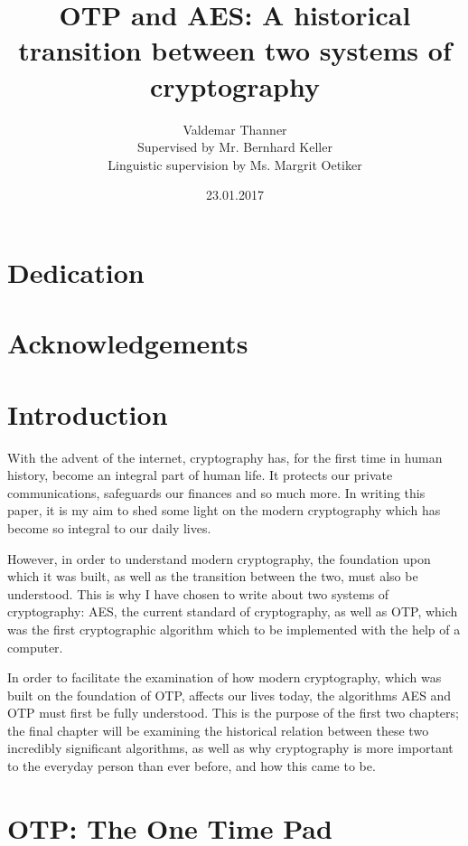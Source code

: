 \documentclass[12pt]{report}
\theoremstyle{definition}
\theoremstyle{remark}
\begin{document}
\title{OTP and AES: A historical transition between two systems of cryptography}
\author{Valdemar Thanner\\Supervised by Mr. Bernhard Keller\\Linguistic supervision by Ms. Margrit Oetiker}
\date{23.01.2017}
\maketitle

\chapter*{Dedication}

\chapter*{Acknowledgements}

\chapter*{Introduction}
With the advent of the internet, cryptography has, for the first time in human history, become an integral part of human life. It protects our private communications, safeguards our finances and so much more. In writing this paper, it is my aim to shed some light on the modern cryptography which has become so integral to our daily lives.

However, in order to understand modern cryptography, the foundation upon which it was built, as well as the transition between the two, must also be understood. This is why I have chosen to write about two systems of cryptography: AES, the current standard of cryptography, as well as OTP, which was the first cryptographic algorithm which to be implemented with the help of a computer.

In order to facilitate the examination of how modern cryptography, which was built on the foundation of OTP, affects our lives today, the algorithms AES and OTP must first be fully understood. This is the purpose of the first two chapters; the final chapter will be examining the historical relation between these two incredibly significant algorithms, as well as why cryptography is more important to the everyday person than ever before, and how this came to be.

\tableofcontents

\chapter{OTP: The One Time Pad}
\end{document}
